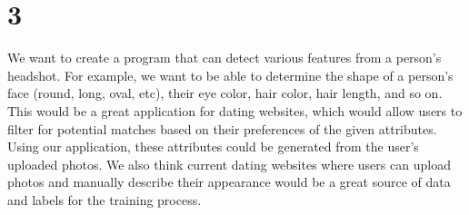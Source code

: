 \documentclass[11pt]{article}
\begin{document}
\section*{3}
We want to create a program that can detect various features from a person's headshot. For example, we want to be able to determine the shape of a person's face (round, long, oval, etc), their eye color, hair color, hair length, and so on. This would be a great application for dating websites, which would allow users to filter for potential matches based on their preferences of the given attributes. Using our application, these attributes could be generated from the user's uploaded photos. We also think current dating websites where users can upload photos and manually describe their appearance would be a great source of data and labels for the training process.
\end{document}
